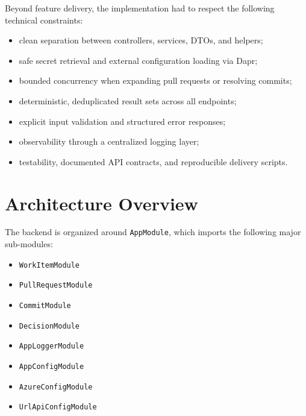 \documentclass[12pt,a4paper]{report}
\newcommand{\code}[1]{\texttt{\small\color{codered}#1}}
\begin{document}
Beyond feature delivery, the implementation had to respect the following
technical constraints:

\begin{itemize}
  \item clean separation between controllers, services, DTOs, and helpers;
  \item safe secret retrieval and external configuration loading via Dapr;
  \item bounded concurrency when expanding pull requests or resolving commits;
  \item deterministic, deduplicated result sets across all endpoints;
  \item explicit input validation and structured error responses;
  \item observability through a centralized logging layer;
  \item testability, documented API contracts, and reproducible delivery scripts.
\end{itemize}

\section{Architecture Overview}

The backend is organized around \code{AppModule}, which imports the following
major sub-modules:

\begin{center}
\begin{tcolorbox}[
  enhanced, colback=screenshotbg, colframe=primary, boxrule=0.8pt, arc=4pt,
  width=0.80\textwidth, left=12pt, right=12pt, top=10pt, bottom=10pt,
  title={\textbf{AppModule - imported modules}},
  fonttitle=\bfseries\small\color{white},
  colbacktitle=primary
]
\begin{itemize}[itemsep=2pt]
  \item \code{WorkItemModule}
  \item \code{PullRequestModule}
  \item \code{CommitModule}
  \item \code{DecisionModule}
  \item \code{AppLoggerModule}
  \item \code{AppConfigModule}
  \item \code{AzureConfigModule}
  \item \code{UrlApiConfigModule}
\end{itemize}
\end{tcolorbox}
\end{center}
\end{document}
